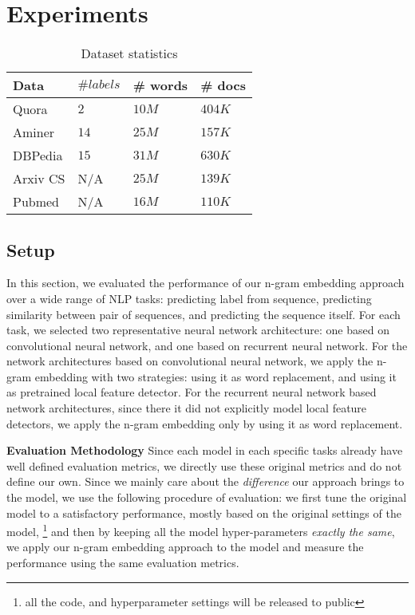 

\section{Experiments}
\label{sec:experiments}

\begin{table}
\center
\begin{tabular}{ >{\centering\arraybackslash}m{1.5cm} || >{\centering\arraybackslash}m{1.5cm} | >{\centering\arraybackslash}m{1.5cm} | >{\centering\arraybackslash}m{ 1.5cm}  }
\hline
\textbf{Data} & $\# labels$ & \# words &  \# docs  \\ \hline
Quora & $2$ & $10M$ & $404K$  \\ 
Aminer &  $14$ & $25M $ &  $157K$  \\ 
DBPedia &  $15$ & $31M$ &  $630K$  \\ 
Arxiv CS & N/A & $25M$ & $139K$ \\
Pubmed & N/A & $16M$ & $110K$ \\ 
 \hline
\end{tabular}
\caption{Dataset statistics}\label{tab-data-stats}
\end{table}

\subsection{Setup}In this section, we evaluated the performance of our n-gram embedding approach over a wide range of NLP tasks: predicting label from sequence, predicting similarity between pair of sequences, and predicting the sequence itself. For each task, we selected two representative neural network architecture: one based on convolutional neural network, and one based on recurrent neural network. For the network architectures based on convolutional neural network, we apply the n-gram embedding with two strategies: using it as word replacement, and using it as pretrained local feature detector. For the recurrent neural network based network architectures, since there it did not explicitly model local feature detectors, we apply the  n-gram embedding only by using it as word replacement.

\noindent \textbf{Evaluation Methodology}
Since each model in each specific tasks already have well defined evaluation metrics, we directly use these original metrics and do not define our own. 
Since we mainly care about the \emph{difference} our approach brings to the model, we use the following procedure of evaluation: 
we first tune the original model to a satisfactory performance, mostly based on the original settings of the model, \footnote{all the code, and hyperparameter settings will be released to public}
and then by keeping all the model hyper-parameters \emph{exactly the same}, we apply our n-gram embedding approach to the model and measure the performance using the same evaluation metrics.





